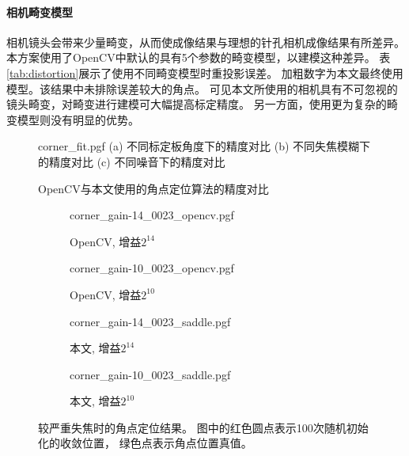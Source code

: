 \paragraph{相机畸变模型}
相机镜头会带来少量畸变，从而使成像结果与理想的针孔相机成像结果有所差异。
本方案使用了OpenCV中默认的具有5个参数的畸变模型，以建模这种差异。
表\ref{tab:distortion}展示了使用不同畸变模型时重投影误差。
加粗数字为本文最终使用模型。该结果中未排除误差较大的角点。
可见本文所使用的相机具有不可忽视的镜头畸变，对畸变进行建模可大幅提高标定精度。
另一方面，使用更为复杂的畸变模型则没有明显的优势。

\begin{figure}[tbh]
    \centering
    {corner_fit.pgf}
    \small
    \null\hfill
    (a) 不同标定板角度下的精度对比\hfill\hfill
    (b) 不同失焦模糊下的精度对比\hfill\hfill
    (c) 不同噪音下的精度对比\hfill\null

    \caption{OpenCV与本文使用的角点定位算法的精度对比}
    \label{fig:corner_fit}
\end{figure}

\begin{figure}[tbh]
    \centering
    \begin{subfigure}{1.57in}
        {corner_gain-14_0023_opencv.pgf}%
        \caption{OpenCV, 增益$2^{14}$}%
    \end{subfigure}%
    \begin{subfigure}{1.57in}
        {corner_gain-10_0023_opencv.pgf}%
        \caption{OpenCV, 增益$2^{10}$}%
    \end{subfigure}%
    \begin{subfigure}{1.57in}
        {corner_gain-14_0023_saddle.pgf}%
        \caption{本文, 增益$2^{14}$}%
    \end{subfigure}%
    \begin{subfigure}{1.57in}
        {corner_gain-10_0023_saddle.pgf}%
        \caption{本文, 增益$2^{10}$}%
    \end{subfigure}%
    \caption[较严重失焦时的角点定位结果]{
        较严重失焦时的角点定位结果。
        图中的红色圆点表示100次随机初始化的收敛位置，
        绿色点表示角点位置真值。
    }
    \label{fig:corner_blur}
\end{figure}

